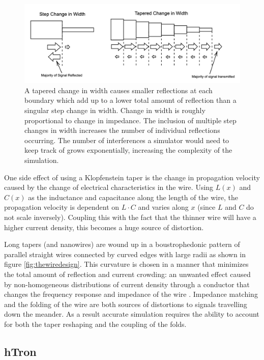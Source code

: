 \begin{figure}
  \centering
  \includegraphics[width=5in]{figs/whatsataper.png}
  
  \caption{A tapered change in width causes smaller reflections at each boundary which add up to a lower total amount of reflection than a singular step change in width. Change in width is roughly proportional to change in impedance. The inclusion of multiple step changes in
  width increases the number of individual reflections occurring. 
  The number of interferences a simulator would need to keep track of grows 
  exponentially, increasing the complexity of the simulation.}
 \label{fig:whatsataper}
\end{figure}

One side effect of using a Klopfenstein taper is the change in propagation velocity 
caused by the change of electrical characteristics in the wire. Using $L(x)$ and $C(x)$ 
as the inductance and capacitance along the length of the wire, 
the propagation velocity is dependent on $L\cdot C$ and varies along $x$ (since 
$L$ and $C$ do not scale inversely). Coupling this with the fact that the thinner wire will 
have a higher current density, this becomes a huge source of distortion.

Long tapers (and nanowires) are wound up in a 
boustrophedonic pattern of parallel straight wires 
connected by curved edges with 
large radii as shown in figure \ref{fig:thewiredesign}. This curvature is chosen in a manner that minimizes the total amount of reflection
and current crowding: an unwanted effect caused by non-homogeneous distributions 
of current density through a conductor that changes the frequency response and impedance 
of the wire \cite{Akhlaghi:12}. Impedance matching and the folding of 
the wire are both sources of distortions
to signals travelling down the meander. As a result accurate simulation requires the ability to account for both the taper reshaping and the coupling of the folds.

\subsection{hTron}


